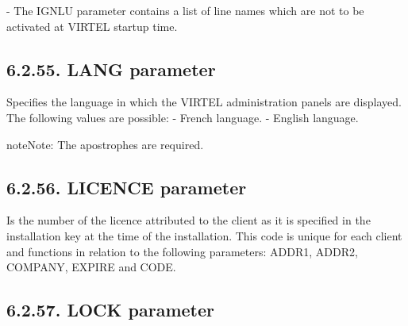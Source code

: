 \documentclass[letterpaper,10pt,english]{sphinxmanual}
\begin{document}
 - The IGNLU parameter contains a list of line names which are not to be activated at VIRTEL startup time.


\subsection{6.2.55. LANG parameter}
\label{\detokenize{Installation_Guide:lang-parameter}}
\begin{sphinxVerbatim}[commandchars=\\\{\}]
                             
\end{sphinxVerbatim}

Specifies the language in which the VIRTEL administration panels are displayed. The following values are possible:
 - French language.
 - English language.

\begin{sphinxadmonition}{note}{Note:}
The apostrophes are required.
\end{sphinxadmonition}


\subsection{6.2.56. LICENCE parameter}
\label{\detokenize{Installation_Guide:licence-parameter}}
\begin{sphinxVerbatim}[commandchars=\\\{\}]
                          
\end{sphinxVerbatim}

Is the number of the licence attributed to the client as it is specified in the installation key at the time of the installation. This code is unique for each client and functions in relation to the following parameters: ADDR1, ADDR2, COMPANY, EXPIRE and CODE.


\subsection{6.2.57. LOCK parameter}
\label{\detokenize{Installation_Guide:lock-parameter}}
\begin{sphinxVerbatim}[commandchars=\\\{\}]
                               
\end{sphinxVerbatim}
\end{document}
